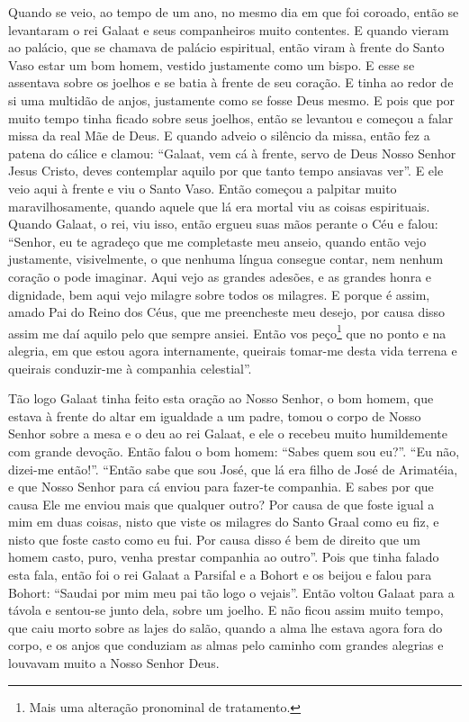 Quando se veio, ao tempo de um ano, no mesmo dia em que foi coroado, então se
levantaram o rei Galaat e seus companheiros muito contentes. E quando vieram ao
palácio, que se chamava de palácio espiritual, então viram à frente do Santo
Vaso estar um bom homem, vestido justamente como um bispo. E esse se assentava
sobre os joelhos e se batia à frente de seu coração. E tinha ao redor de si uma
multidão de anjos, justamente como se fosse Deus mesmo. E pois que por muito
tempo tinha ficado sobre seus joelhos, então se levantou e começou a falar
missa da real Mãe de Deus. E quando adveio o silêncio da missa, então fez a
patena do cálice e clamou: “Galaat, vem cá à frente, servo de Deus Nosso Senhor
Jesus Cristo, deves contemplar aquilo por que tanto tempo ansiavas ver”. E ele
veio aqui à frente e viu o Santo Vaso. Então começou a palpitar muito
maravilhosamente, quando aquele que lá era mortal viu as coisas espirituais.
Quando Galaat, o rei, viu isso, então ergueu suas mãos perante o Céu e falou:
“Senhor, eu te agradeço que me completaste meu anseio, quando então vejo
justamente, visivelmente, o que nenhuma língua consegue contar, nem nenhum
coração o pode imaginar. Aqui vejo as grandes adesões, e as grandes honra e
dignidade, bem aqui vejo milagre sobre todos os milagres. E porque é assim,
amado Pai do Reino dos Céus, que me preencheste meu desejo, por causa disso
assim me daí aquilo pelo que sempre ansiei. Então vos peço\footnote{ Mais uma
alteração pronominal de tratamento.} que no ponto e na alegria,  em
que estou agora internamente, queirais tomar-me desta vida terrena e queirais
conduzir-me à companhia celestial”.

Tão logo Galaat tinha feito esta oração ao Nosso Senhor, o bom homem, que estava
à frente do altar em igualdade a um padre, tomou o corpo de Nosso Senhor sobre
a mesa e o deu ao rei Galaat, e ele o recebeu muito humildemente com grande
devoção. Então falou o bom homem: “Sabes quem sou eu?”. “Eu não, dizei-me
então!”. “Então sabe que sou José, que lá era filho de José de Arimatéia, e que
Nosso Senhor para cá enviou para fazer-te companhia. E sabes por que causa Ele
me enviou mais que qualquer outro? Por causa de que foste igual a mim em duas
coisas, nisto que viste os milagres do Santo Graal como eu fiz, e nisto que
foste casto como eu fui. Por causa disso é bem de direito que um homem casto,
puro, venha prestar companhia ao outro”. Pois que tinha falado esta
fala, então foi o rei Galaat a Parsifal e a Bohort e os beijou e falou para
Bohort: “Saudai por mim meu pai tão logo o vejais”. Então voltou Galaat para a
távola e sentou-se junto dela, sobre um joelho. E não ficou assim muito tempo,
que caiu morto sobre as lajes do salão, quando a alma lhe estava agora fora do
corpo, e os anjos que conduziam as almas pelo caminho com grandes alegrias e
louvavam muito a Nosso Senhor Deus.

